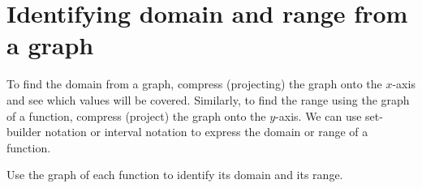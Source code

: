 \section{Identifying domain and range from a graph}
To find the domain from a graph, compress (projecting) the graph onto the $x$-axis and see which values will be covered.  Similarly, to find the range using the graph of a function, compress (project) the graph onto the $y$-axis. We can use set-builder notation or interval notation to express the domain or range of a function.
\begin{exa}
    Use the graph of each function to identify its domain and its range.
\end{exa}

\vspace{-0.4cm}
\begin{figure}[ht]
\centering
{}
 \qquad
{}
 \qquad
{}
\end{figure}
